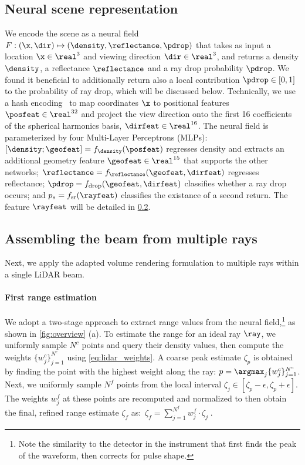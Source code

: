 \subsection{Neural scene representation}\label{sec:neural_scene_rep}
We encode the scene as a neural field $F: (\x, \dir) \mapsto (\density, \reflectance, \pdrop)$ that takes as input a location $\x \in \real^3$ and viewing direction $\dir \in \real^3$, and returns a density $\density$, a reflectance $\reflectance$ and a ray drop probability $\pdrop$. We found it beneficial to additionally return also a local contribution $\pdrop \in [0, 1]$ to the probability of ray drop, which will be discussed below.
Technically, we use a hash encoding~\cite{muller2022instant} to map coordinates $\x$ to positional features $\posfeat \in \real^{32}$ and project the view direction onto the first 16 coefficients of the spherical harmonics basis, $\dirfeat \in \real^{16}$. The neural field is parameterized by four Multi-Layer Perceptrons (MLPs): $[\density; \geofeat] = f_\density(\posfeat)$ regresses density and extracts an additional geometry feature $\geofeat \in \real^{15}$ that supports the other networks; $\reflectance = f_{\reflectance}(\geofeat, \dirfeat)$ regresses reflectance; $\pdrop = f_{\text{drop}}(\geofeat, \dirfeat)$ classifies whether a ray drop occurs; and  $p_s = f_{\text{sr}}(\rayfeat)$ classifies the existance of a second return. The feature $\rayfeat$ will be detailed in \cref{sec:render_lidar}.





\subsection{Assembling the beam from multiple rays}
\label{sec:render_lidar}
Next, we apply the adapted volume rendering formulation to multiple rays within a single LiDAR beam.


\paragraph{First range estimation}
We adopt a two-stage approach to extract range values from the neural field,\footnote{Note the similarity to the detector in the instrument that first finds the peak of the waveform, then corrects for pulse shape.} as shown in \cref{fig:overview} (a).
To estimate the range for an ideal ray $\ray$, we uniformly sample $N^c$ points and query their density values, then compute the weights $\{w^c_j\}_{j=1}^{N^c}$ using \cref{eq:lidar_weights}. A coarse peak estimate $\zeta_p$ is obtained by finding the point with the highest weight along the ray: $p = \argmax_j \{w^c_j\}_{j=1}^{N^c} $. Next, we uniformly sample $N^f$ points from the local interval $\zeta_j \in [\zeta_p - \epsilon, \zeta_p + \epsilon]$. The weights $w_j^f$ at these points are recomputed and normalized to then obtain the final, refined range estimate $\zeta_f$ as:~$\zeta_f = \sum_{j=1}^{N^f} w^f_j \cdot \zeta_j\;.$



